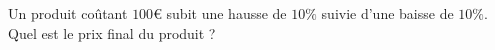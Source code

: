 
\begin{exercice}\label{exosmath-0039}

    Un produit coûtant \( 100\)€ subit une hausse de \( 10\%\) suivie d'une baisse de \( 10\%\). Quel est le prix final du produit ?

\end{exercice}

